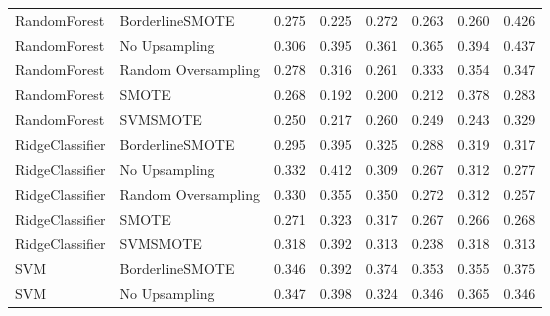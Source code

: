 \begin{tabular}{llllllll}
                RandomForest &     BorderlineSMOTE & 0.275 &                     0.225 &                 0.272 &                  0.263 &                                   0.260 &     0.426 \\
                RandomForest &       No Upsampling & 0.306 &                     0.395 &                 0.361 &                  0.365 &                                   0.394 &     0.437 \\
                RandomForest & Random Oversampling & 0.278 &                     0.316 &                 0.261 &                  0.333 &                                   0.354 &     0.347 \\
                RandomForest &               SMOTE & 0.268 &                     0.192 &                 0.200 &                  0.212 &                                   0.378 &     0.283 \\
                RandomForest &            SVMSMOTE & 0.250 &                     0.217 &                 0.260 &                  0.249 &                                   0.243 &     0.329 \\
             RidgeClassifier &     BorderlineSMOTE & 0.295 &                     0.395 &                 0.325 &                  0.288 &                                   0.319 &     0.317 \\
             RidgeClassifier &       No Upsampling & 0.332 &                     0.412 &                 0.309 &                  0.267 &                                   0.312 &     0.277 \\
             RidgeClassifier & Random Oversampling & 0.330 &                     0.355 &                 0.350 &                  0.272 &                                   0.312 &     0.257 \\
             RidgeClassifier &               SMOTE & 0.271 &                     0.323 &                 0.317 &                  0.267 &                                   0.266 &     0.268 \\
             RidgeClassifier &            SVMSMOTE & 0.318 &                     0.392 &                 0.313 &                  0.238 &                                   0.318 &     0.313 \\
                         SVM &     BorderlineSMOTE & 0.346 &                     0.392 &                 0.374 &                  0.353 &                                   0.355 &     0.375 \\
                         SVM &       No Upsampling & 0.347 &                     0.398 &                 0.324 &                  0.346 &                                   0.365 &     0.346 \\

\end{tabular}
